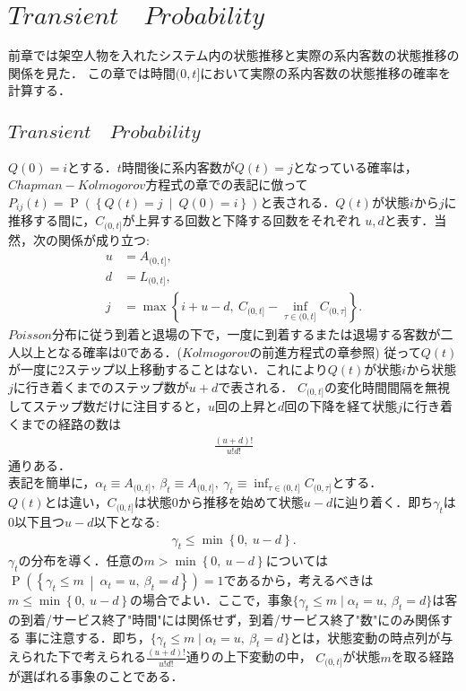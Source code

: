\documentclass[a4j,papersize,disablejfam,slide,14pt]{jsarticle}
\def\max#1#2{\operatorname{max} \left\{ #1,\ #2 \right\}} %
\def\min#1#2{\operatorname{min} \left\{ #1,\ #2 \right\}} %
\def\inf#1#2{\operatorname*{inf}_{#1} #2 } %
\def\cprob#1#2{\operatorname{P} \left(\left\{ #1 \ \middle|\ #2 \right\}\right)} %
\begin{document}
\section{$Transient\quad Probability$}
	前章では架空人物を入れたシステム内の状態推移と実際の系内客数の状態推移の関係を見た．
	この章では時間$(0,t]$において実際の系内客数の状態推移の確率を計算する．

\subsection{$Transient\quad Probability$}
    $Q(0)=i$とする．$t$時間後に系内客数が$Q(t)=j$となっている確率は，$Chapman-Kolmogorov$方程式の章での表記に倣って
    $P_{ij}(t) = \cprob{Q(t)=j}{Q(0)=i}$と表される．$Q(t)$が状態$i$から$j$に推移する間に，$C_{(0, t]}$が上昇する回数と下降する回数をそれぞれ
    $u,d$と表す．当然，次の関係が成り立つ:
    \begin{align}
    	u &= A_{(0, t]}, \\
        d &= L_{(0, t]}, \\
    	j &= \max{i + u - d}{C_{(0, t]} - \inf{\tau \in (0, t]}{C_{(0, \tau]}}}. 
    \end{align}
    $Poisson$分布に従う到着と退場の下で，一度に到着するまたは退場する客数が二人以上となる確率は$0$である．($Kolmogorov$の前進方程式の章参照)
    従って$Q(t)$が一度に$2$ステップ以上移動することはない．これにより$Q(t)$が状態$i$から状態$j$に行き着くまでのステップ数が$u+d$で表される．
    $C_{(0, t]}$の変化時間間隔を無視してステップ数だけに注目すると，$u$回の上昇と$d$回の下降を経て状態$j$に行き着くまでの経路の数は
    \begin{align}
    	\frac{(u+d)!}{u!d!}
    \end{align}
    通りある．\\
    表記を簡単に，$\alpha_t \equiv A_{(0, t]},\ \beta_t \equiv A_{(0, t]},\ \gamma_t \equiv \inf{\tau \in (0, t]}{C_{(0, \tau]}}$とする．\\
    $Q(t)$とは違い，$C_{(0, t]}$は状態$0$から推移を始めて状態$u - d$に辿り着く．即ち$\gamma_t$は$0$以下且つ$u-d$以下となる:
    \begin{align}
    	\gamma_t \leq \min{0}{u - d}.
    \end{align}
    $\gamma_t$の分布を導く．任意の$m > \min{0}{u - d}$については$\cprob{\gamma_t \leq m}{\alpha_t = u,\ \beta_t = d} = 1$であるから，考えるべきは
    $m \leq \min{0}{u - d}$の場合でよい．ここで，事象$\{ \gamma_t \leq m \mid \alpha_t = u,\ \beta_t = d \}$は客の到着/サービス終了"時間"には関係せず，到着/サービス終了"数"にのみ関係する
    事に注意する．即ち，$\{ \gamma_t \leq m \mid \alpha_t = u,\ \beta_t = d \}$とは，状態変動の時点列が与えられた下で考えられる$\frac{(u+d)!}{u!d!}$通りの上下変動の中，
    $C_{(0, t]}$が状態$m$を取る経路が選ばれる事象のことである．
    
\end{document}
